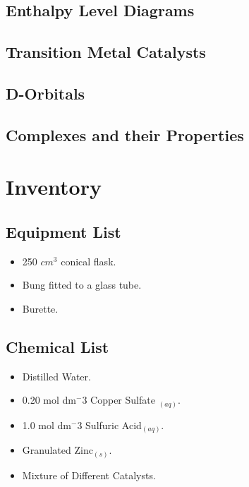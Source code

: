 	\subsection{Enthalpy Level Diagrams}	







	\subsection{Transition Metal Catalysts}



	\subsection{D-Orbitals}



	\subsection{Complexes and their Properties}


\section{Inventory}

	\subsection{Equipment List}
\begin{itemize}
\item 250 $cm^3$ conical flask.
\item Bung fitted to a glass tube.
\item Burette.
\end{itemize}

	\subsection{Chemical List}
\begin{itemize}
\item Distilled Water.
\item 0.20 mol dm$^-3$ Copper Sulfate ${_(aq)}$.
\item 1.0 mol dm$^-3$ Sulfuric Acid${_(aq)}$.
\item Granulated Zinc${_(s)}$.
\item Mixture of Different Catalysts.
\end{itemize}




